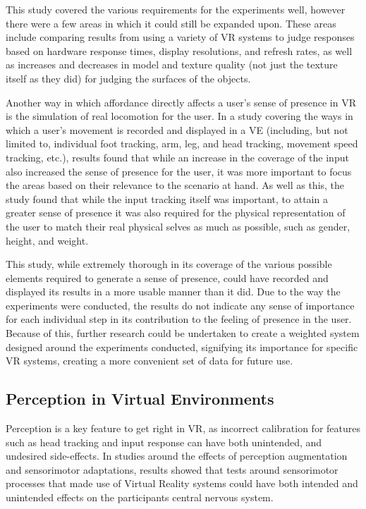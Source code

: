 		This study covered the various requirements for the experiments well, however there were a few areas in which it could still be expanded upon.
		These areas include comparing results from using a variety of VR systems to judge responses based on hardware response times, display resolutions, and refresh rates, as well as increases and decreases in model and texture quality (not just the texture itself as they did) for judging the surfaces of the objects.

		Another way in which affordance directly affects a user's sense of presence in VR is the simulation of real locomotion for the user.
		In a study \cite{Turchet2015} covering the ways in which a user's movement is recorded and displayed in a VE (including, but not limited to, individual foot tracking, arm, leg, and head tracking, movement speed tracking, etc.), results found that while an increase in the coverage of the input also increased the sense of presence for the user, it was more important to focus the areas based on their relevance to the scenario at hand.
		As well as this, the study found that while the input tracking itself was important, to attain a greater sense of presence it was also required for the physical representation of the user to match their real physical selves as much as possible, such as gender, height, and weight.

		This study, while extremely thorough in its coverage of the various possible elements required to generate a sense of presence, could have recorded and displayed its results in a more usable manner than it did.
		Due to the way the experiments were conducted, the results do not indicate any sense of importance for each individual step in its contribution to the feeling of presence in the user.
		Because of this, further research could be undertaken to create a weighted system designed around the experiments conducted, signifying its importance for specific VR systems, creating a more convenient set of data for future use.

	\subsection{Perception in Virtual Environments}
	\label{lr:vr:perception}
		Perception is a key feature to get right in VR, as incorrect calibration for features such as head tracking and input response can have both unintended, and undesired side-effects. In studies \cite{Wright2006}  \cite{Wright2009} \cite{Wright2011} \cite{Wright2013} \cite{Wright2014} around the effects of perception augmentation and sensorimotor adaptations, results showed that tests around sensorimotor processes that made use of Virtual Reality systems could have both intended and unintended effects on the participants central nervous system. 


